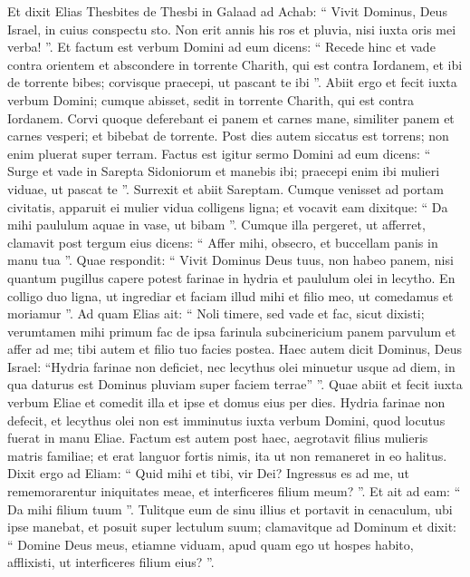 \begin{biblechapter}
\begin{biblechapter}
\begin{biblechapter}
\begin{biblechapter}
\begin{biblechapter}
\begin{biblechapter}
\begin{biblechapter}
\begin{biblechapter}
\begin{biblechapter}
\begin{biblechapter}
\begin{biblechapter}
\begin{biblechapter}
\begin{biblechapter}
\begin{biblechapter}
\begin{biblechapter}
\begin{biblechapter}
\begin{biblechapter}
\verse Et dixit Elias Thesbites de Thesbi in Galaad ad Achab: “ Vivit Dominus, Deus Israel, in cuius conspectu sto. Non erit annis his ros et pluvia, nisi iuxta oris mei verba! ”.
 \verse Et factum est verbum Domini ad eum dicens: 
\verse “ Recede hinc et vade contra orientem et abscondere in torrente Charith, qui est contra Iordanem, 
\verse et ibi de torrente bibes; corvisque praecepi, ut pascant te ibi ”. 
\verse Abiit ergo et fecit iuxta verbum Domini; cumque abisset, sedit in torrente Charith, qui est contra Iordanem. 
\verse Corvi quoque deferebant ei panem et carnes mane, similiter panem et carnes vesperi; et bibebat de torrente. 
\verse Post dies autem siccatus est torrens; non enim pluerat super terram.
 \verse Factus est igitur sermo Domini ad eum dicens: 
\verse “ Surge et vade in Sarepta Sidoniorum et manebis ibi; praecepi enim ibi mulieri viduae, ut pascat te ”. 
\verse Surrexit et abiit Sareptam. Cumque venisset ad portam civitatis, apparuit ei mulier vidua colligens ligna; et vocavit eam dixitque: “ Da mihi paululum aquae in vase, ut bibam ”. 
\verse Cumque illa pergeret, ut afferret, clamavit post tergum eius dicens: “ Affer mihi, obsecro, et buccellam panis in manu tua ”. 
\verse Quae respondit: “ Vivit Dominus Deus tuus, non habeo panem, nisi quantum pugillus capere potest farinae in hydria et paululum olei in lecytho. En colligo duo ligna, ut ingrediar et faciam illud mihi et filio meo, ut comedamus et moriamur ”.
 \verse Ad quam Elias ait: “ Noli timere, sed vade et fac, sicut dixisti; verumtamen mihi primum fac de ipsa farinula subcinericium panem parvulum et affer ad me; tibi autem et filio tuo facies postea. 
\verse Haec autem dicit Dominus, Deus Israel: “Hydria farinae non deficiet, nec lecythus olei minuetur usque ad diem, in qua daturus est Dominus pluviam super faciem terrae” ”. 
\verse Quae abiit et fecit iuxta verbum Eliae et comedit illa et ipse et domus eius per dies. 
\verse Hydria farinae non defecit, et lecythus olei non est imminutus iuxta verbum Domini, quod locutus fuerat in manu Eliae.
 \verse Factum est autem post haec, aegrotavit filius mulieris matris familiae; et erat languor fortis nimis, ita ut non remaneret in eo halitus. 
\verse Dixit ergo ad Eliam: “ Quid mihi et tibi, vir Dei? Ingressus es ad me, ut rememorarentur iniquitates meae, et interficeres filium meum? ”. 
\verse Et ait ad eam: “ Da mihi filium tuum ”. Tulitque eum de sinu illius et portavit in cenaculum, ubi ipse manebat, et posuit super lectulum suum; 
\verse clamavitque ad Dominum et dixit: “ Domine Deus meus, etiamne viduam, apud quam ego ut hospes habito, afflixisti, ut interficeres filium eius? ”. 

\end{biblechapter}
\end{biblechapter}
\end{biblechapter}
\end{biblechapter}
\end{biblechapter}
\end{biblechapter}
\end{biblechapter}
\end{biblechapter}
\end{biblechapter}
\end{biblechapter}
\end{biblechapter}
\end{biblechapter}
\end{biblechapter}
\end{biblechapter}
\end{biblechapter}
\end{biblechapter}
\end{biblechapter}
